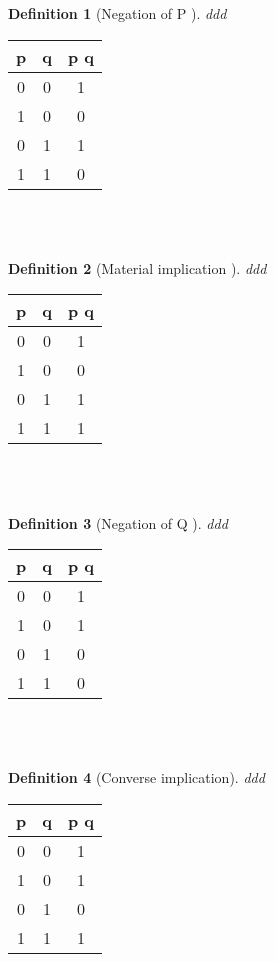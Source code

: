 \documentclass[10pt,a4paper,draft,titlepage,onecolumn]{book}
\newtheorem{definition}{Definition}[section]
\begin{document}
\begin{definition}[Negation of P ]ddd
\end{definition}
\begin{tabular}{ |c|c|c| }
 \hline
 p & q &  p  q  \\
 \hline
 0 & 0 & 1 \\
 1 & 0 & 0\\
 0 & 1 & 1\\
 1 & 1 & 0\\
 \hline
\end{tabular}\\\\



\begin{definition}[Material implication  ]ddd
\end{definition}
\begin{tabular}{ |c|c|c| }
 \hline
 p & q &  p  q  \\
 \hline
 0 & 0 & 1 \\
 1 & 0 & 0\\
 0 & 1 & 1\\
 1 & 1 & 1\\
 \hline
\end{tabular}\\\\

\begin{definition}[Negation of Q ]ddd
\end{definition}
\begin{tabular}{ |c|c|c| }
 \hline
 p & q &  p  q  \\
 \hline
 0 & 0 & 1 \\
 1 & 0 & 1\\
 0 & 1 & 0\\
 1 & 1 & 0\\
 \hline
\end{tabular}\\\\


\begin{definition}[Converse implication]ddd
\end{definition}

\begin{tabular}{ |c|c|c| }
 \hline
 p & q &  p  q  \\
 \hline
 0 & 0 & 1 \\
 1 & 0 & 1\\
 0 & 1 & 0\\
 1 & 1 & 1\\
 \hline
\end{tabular}
\end{document}
